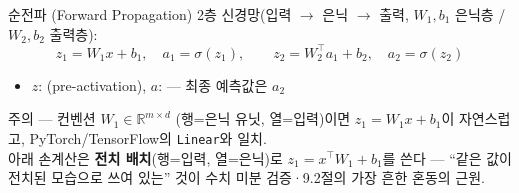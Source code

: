 \begin{frame}{순전파 (Forward Propagation)}
  2층 신경망(입력 $\to$ 은닉 $\to$ 출력, $W_1, b_1$ 은닉층 / $W_2, b_2$ 출력층):
  \[
  z_1 = W_1 x + b_1, \quad a_1 = \sigma(z_1),
  \qquad
  z_2 = W_2^\top a_1 + b_2, \quad a_2 = \sigma(z_2)
  \]
  \begin{itemize}
    \item $z$: (pre-activation), \; $a$:  —
      최종 예측값은 $a_2$
  \end{itemize}
  \begin{block}{주의 — 컨벤션}
    $W_1 \in \mathbb{R}^{m \times d}$ (행=은닉 유닛, 열=입력)이면
    $z_1 = W_1 x + b_1$이 자연스럽고, PyTorch/TensorFlow의 \texttt{Linear}와 일치.
    \\ 아래 손계산은 \textbf{전치 배치}(행=입력, 열=은닉)로 $z_1 = x^\top W_1 + b_1$를
    쓴다 — ``같은 값이 전치된 모습으로 쓰여 있는'' 것이 수치 미분 검증·9.2절의
    가장 흔한 혼동의 근원.
  \end{block}
\end{frame}

